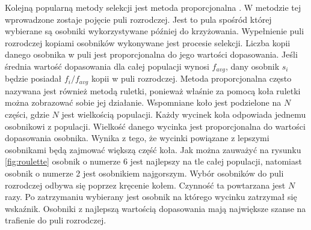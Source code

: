 \documentclass[twoside]{iisthesis}
\begin{document}
Kolejną popularną metody selekcji jest metoda proporcjonalna \cite{book}. W metodzie tej wprowadzone zostaje pojęcie puli rozrodczej. Jest to pula spośród której wybierane są osobniki wykorzystywane później do krzyżowania. Wypełnienie puli rozrodczej kopiami osobników wykonywane jest procesie selekcji. Liczba kopii danego osobnika w puli jest proporcjonalna do jego wartości dopasowania. Jeśli średnia wartość dopasowania dla całej populacji wynosi $f_{avg}$, dany osobnik $s_{i}$ będzie posiadał $f_{i}/f_{avg}$ kopii w puli rozrodczej. Metoda proporcjonalna często nazywana jest również metodą ruletki, ponieważ właśnie za pomocą koła ruletki można zobrazować sobie jej działanie. Wspomniane koło jest podzielone na $N$ części, gdzie $N$ jest wielkością populacji. Każdy wycinek koła odpowiada jednemu osobnikowi z populacji. Wielkość danego wycinka jest proporcjonalna do wartości dopasowania osobnika. Wynika z tego, że wycinki powiązane z lepszymi osobnikami będą zajmować większą część koła. Jak można zauważyć na rysunku \eqref{fig:roulette} osobnik o numerze 6 jest najlepszy na tle całej populacji, natomiast osobnik o numerze 2 jest osobnikiem najgorszym. Wybór osobników do puli rozrodczej odbywa się poprzez kręcenie kołem. Czynność ta powtarzana jest $N$ razy. Po zatrzymaniu wybierany jest osobnik na którego wycinku zatrzymał się wskaźnik. Osobniki z najlepszą wartością dopasowania mają największe szanse na trafienie do puli rozrodczej.
\end{document}
